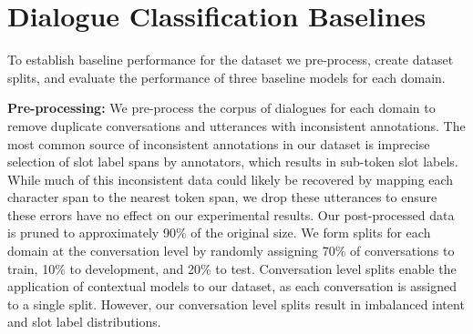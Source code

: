 \section{Dialogue Classification Baselines}\label{Baselines}
To establish baseline performance for the \multidogo dataset we pre-process, create dataset splits, and evaluate the performance of three baseline models for each domain. 

\textbf{Pre-processing:}
We pre-process the corpus of dialogues for each domain to remove duplicate conversations and utterances with inconsistent annotations. 
The most common source of inconsistent annotations in our dataset is imprecise selection of slot label spans by annotators, which results in sub-token slot labels. 
While much of this inconsistent data could likely be recovered by mapping each character span to the nearest token span, we drop these utterances to ensure these errors have no effect on our experimental results.
Our post-processed data is pruned to approximately 90\% of the original size. 
We form splits for each domain at the conversation level by randomly assigning
70\% of conversations to train, 10\% to development, and 20\% to test.
Conversation level splits enable the application of contextual models to our dataset, as each conversation is assigned to a single split. However, our conversation level splits result in imbalanced intent and slot label distributions. %

